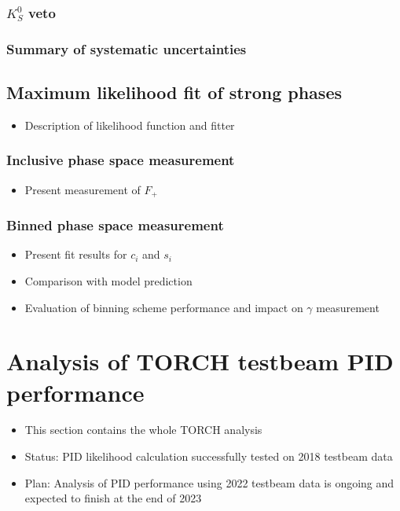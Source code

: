 \documentclass[12pt, a4paper, notitlepage, onecolumn]{article}
\begin{document}
\subsubsection{\texorpdfstring{$K^0_S$}{KS0} veto}
\subsubsection{Summary of systematic uncertainties}
\subsection{Maximum likelihood fit of strong phases}
  \begin{itemize}[nosep]
    \setlength{\itemindent}{2em}
    \item[\textendash]{Description of likelihood function and fitter}
  \end{itemize}
\subsubsection{Inclusive phase space measurement}
  \begin{itemize}[nosep]
    \setlength{\itemindent}{2.5em}
    \item[\textasteriskcentered]{Present measurement of $F_+$}
  \end{itemize}
\subsubsection{Binned phase space measurement}
  \begin{itemize}[nosep]
    \setlength{\itemindent}{2.5em}
    \item[\textasteriskcentered]{Present fit results for $c_i$ and $s_i$}
    \item[\textasteriskcentered]{Comparison with model prediction}
    \item[\textasteriskcentered]{Evaluation of binning scheme performance and impact on $\gamma$ measurement}
  \end{itemize}

\section{Analysis of TORCH testbeam PID performance}
  \begin{itemize}[nosep]
    \setlength{\itemindent}{0em}
    \item{This section contains the whole TORCH analysis}
    \item{Status: PID likelihood calculation successfully tested on 2018 testbeam data}
    \item{Plan: Analysis of PID performance using 2022 testbeam data is ongoing and expected to finish at the end of 2023}
  \end{itemize}
\end{document}
